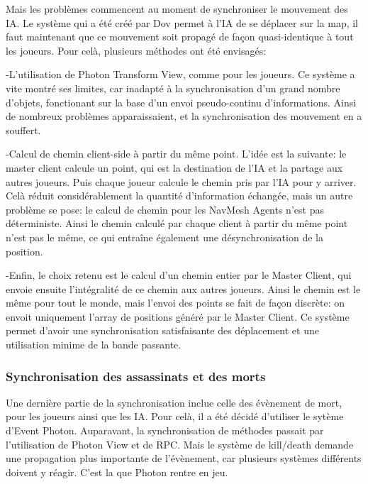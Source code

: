         Mais les problèmes commencent au moment de synchroniser le mouvement des IA. Le système qui a été créé par Dov permet
        à l'IA de se déplacer sur la map, il faut maintenant que ce mouvement soit propagé de façon quasi-identique à tout les joueurs.
        Pour celà, plusieurs méthodes ont été envisagés:

            -L'utilisation de Photon Transform View, comme pour les joueurs. Ce système a vite montré ses limites, car inadapté à la synchronisation
            d'un grand nombre d'objets, fonctionant sur la base d'un envoi pseudo-continu d'informations. Ainsi de nombreux problèmes apparaissaient,
            et la synchronisation des mouvement en a souffert. 

            -Calcul de chemin client-side à partir du même point. L'idée est la suivante: le master client calcule un point, qui est la destination
            de l'IA et la partage aux autres joueurs. Puis chaque joueur calcule le chemin pris par l'IA pour y arriver. Celà réduit considérablement la
            quantité d'information échangée, mais un autre problème se pose: le calcul de chemin pour les NavMesh Agents n'est pas déterministe. Ainsi le
            chemin calculé par chaque client à partir du même point n'est pas le même, ce qui entraîne également une désynchronisation de la position.

            -Enfin, le choix retenu est le calcul d'un chemin entier par le Master Client, qui envoie ensuite l'intégralité de ce chemin aux autres joueurs.
            Ainsi le chemin est le même pour tout le monde, mais l'envoi des points se fait de façon discrète: on envoit uniquement l'array de positions généré
            par le Master Client. Ce système permet d'avoir une synchronisation satisfaisante des déplacement et une utilisation minime de la bande passante.

    \subsubsection{Synchronisation des assassinats et des morts}
            Une dernière partie de la synchronisation inclue celle des évènement de mort, pour les joueurs ainsi
            que les IA. Pour celà, il a été décidé d'utiliser le sytème d'Event Photon. Auparavant, la synchronisation de méthodes
            passait par l'utilisation de Photon View et de RPC. Mais le système de kill/death demande une propagation plus importante
            de l'évènement, car plusieurs systèmes différents doivent y réagir. C'est la que Photon rentre en jeu.

